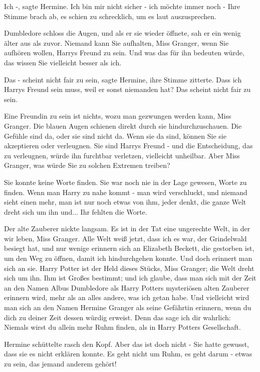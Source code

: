 \glqq{}Ich -\grqq{}, sagte Hermine. \glqq{}Ich bin mir nicht sicher - ich möchte
immer noch -\grqq{} Ihre Stimme brach ab, es schien zu schrecklich, um es laut
auszusprechen.

Dumbledore schloss die Augen, und als er sie wieder öffnete, sah er ein wenig
älter aus als zuvor. \glqq{}Niemand kann Sie aufhalten, Miss Granger, wenn Sie
aufhören wollen, Harrys Freund zu sein. Und was das für ihn bedeuten würde, das
wissen Sie vielleicht besser als ich.\grqq{}

\glqq{}Das - scheint nicht fair zu sein\grqq{}, sagte Hermine, ihre Stimme
zitterte. \glqq{}Dass ich Harrys Freund sein muss, weil er sonst niemanden hat?
Das scheint nicht fair zu sein.\grqq{}

\glqq{}Eine Freundin zu sein ist nichts, wozu man gezwungen werden kann, Miss
Granger.\grqq{} Die blauen Augen schienen direkt durch sie hindurchzuschauen.
\glqq{}Die Gefühle sind da, oder sie sind nicht da. Wenn sie da sind, können Sie
sie akzeptieren oder verleugnen. Sie sind Harrys Freund - und die Entscheidung,
das zu verleugnen, würde ihn furchtbar verletzen, vielleicht unheilbar. Aber
Miss Granger, was würde Sie zu solchen Extremen treiben?\grqq{}

Sie konnte keine Worte finden. Sie war noch nie in der Lage gewesen, Worte zu
finden. \glqq{}Wenn man Harry zu nahe kommt - man wird verschluckt, und niemand
sieht einen mehr, man ist nur noch etwas von ihm, jeder denkt, die ganze Welt
dreht sich um ihn und...\grqq{} Ihr fehlten die Worte.

Der alte Zauberer nickte langsam. \glqq{}Es ist in der Tat eine ungerechte Welt,
in der wir leben, Miss Granger. Alle Welt weiß jetzt, dass ich es war, der
Grindelwald besiegt hat, und nur wenige erinnern sich an Elizabeth Beckett, die
gestorben ist, um den Weg zu öffnen, damit ich hindurchgehen konnte. Und doch
erinnert man sich an sie. Harry Potter ist der Held dieses Stücks, Miss Granger;
die Welt dreht sich um ihn. Ihm ist Großes bestimmt; und ich glaube, dass man
sich mit der Zeit an den Namen Albus Dumbledore als Harry Potters mysteriösen
alten Zauberer erinnern wird, mehr als an alles andere, was ich getan habe. Und
vielleicht wird man sich an den Namen Hermine Granger als seine Gefährtin
erinnern, wenn du dich zu deiner Zeit dessen würdig erweist. Denn das sage ich
dir wahrlich: Niemals wirst du allein mehr Ruhm finden, als in Harry Potters
Gesellschaft.\grqq{}

Hermine schüttelte rasch den Kopf. \glqq{}Aber das ist doch nicht -\grqq{} Sie
hatte gewusst, dass sie es nicht erklären konnte. \glqq{}Es geht nicht um Ruhm,
es geht darum - etwas zu sein, das jemand anderem gehört!\grqq{}

